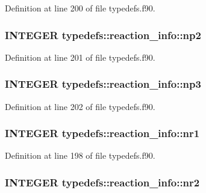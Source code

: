 Definition at line 200 of file typedefs.f90.\hypertarget{typetypedefs_1_1reaction__info_a33ba0f7158b887f3208dd1e8684e3b04}{
\subsubsection[{np2}]{\setlength{\rightskip}{0pt plus 5cm}INTEGER {\bf typedefs::reaction\_\-info::np2}}}
\label{typetypedefs_1_1reaction__info_a33ba0f7158b887f3208dd1e8684e3b04}


Definition at line 201 of file typedefs.f90.\hypertarget{typetypedefs_1_1reaction__info_a8963dd589f446e518865aebddeb04872}{
\subsubsection[{np3}]{\setlength{\rightskip}{0pt plus 5cm}INTEGER {\bf typedefs::reaction\_\-info::np3}}}
\label{typetypedefs_1_1reaction__info_a8963dd589f446e518865aebddeb04872}


Definition at line 202 of file typedefs.f90.\hypertarget{typetypedefs_1_1reaction__info_a003f90458400f3d035bc43e7d7d20525}{
\subsubsection[{nr1}]{\setlength{\rightskip}{0pt plus 5cm}INTEGER {\bf typedefs::reaction\_\-info::nr1}}}
\label{typetypedefs_1_1reaction__info_a003f90458400f3d035bc43e7d7d20525}


Definition at line 198 of file typedefs.f90.\hypertarget{typetypedefs_1_1reaction__info_a48ab28601339c673e8ae61c8ab9386b2}{
\subsubsection[{nr2}]{\setlength{\rightskip}{0pt plus 5cm}INTEGER {\bf typedefs::reaction\_\-info::nr2}}}
\label{typetypedefs_1_1reaction__info_a48ab28601339c673e8ae61c8ab9386b2}


